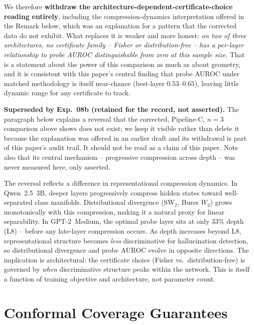 \documentclass[onecolumn]{jmlr}
\begin{document}
We therefore \textbf{withdraw the architecture-dependent-certificate-choice
reading entirely}, including the compression-dynamics interpretation offered in
the Remark below, which was an explanation for a pattern that the corrected
data do not exhibit. What replaces it is weaker and more honest: \emph{on two
of three architectures, no certificate family -- Fisher or distribution-free --
has a per-layer relationship to probe AUROC distinguishable from zero at this
sample size.} That is a statement about the power of this comparison as much as
about geometry, and it is consistent with this paper's central finding that
probe AUROC under matched methodology is itself near-chance
(best-layer $0.53$--$0.65$), leaving little dynamic range for any certificate to track.

\begin{remark}
\textbf{Superseded by Exp.~08b (retained for the record, not asserted).} The
paragraph below explains a reversal that the corrected, Pipeline-C, $n{=}3$
comparison above shows does not exist; we keep it visible rather than delete it
because the explanation was offered in an earlier draft and its withdrawal is
part of this paper's audit trail. It should not be read as a claim of this
paper. Note also that its central mechanism -- progressive compression across
depth -- was never measured here, only asserted.

The reversal reflects a difference in representational compression
dynamics. In Qwen~2.5~3B, deeper layers progressively compress hidden
states toward well-separated class manifolds. Distributional divergence
(SW$_2$, Bures $W_2$) grows monotonically with this compression, making
it a natural proxy for linear separability. In GPT-2~Medium, the
optimal probe layer sits at only $33\%$ depth (L8) -- before any
late-layer compression occurs. As depth increases beyond L8,
representational structure becomes \emph{less} discriminative for
hallucination detection, so distributional divergence and probe AUROC
evolve in opposite directions. The implication is architectural: the
certificate choice (Fisher vs.\ distribution-free) is governed by
\emph{when} discriminative structure peaks within the network. This is
itself a function of training objective and architecture, not
parameter count.
\end{remark}

\FloatBarrier
\section{Conformal Coverage Guarantees}
\label{sec:conformal}
\end{document}
